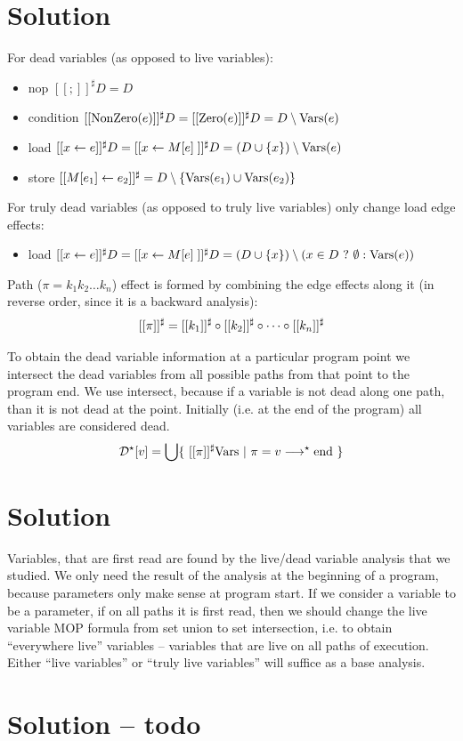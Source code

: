 \documentclass[a4paper]{article}
\def\la{\leftarrow}
\begin{document}
\section{Solution}
  For dead variables (as opposed to live variables):
  \begin{itemize}
    \item nop $ [[;]]^\sharp D = D $
    \item condition $ [[\mathrm{NonZero}(e)]]^\sharp D = [[\mathrm{Zero}(e)]]^\sharp D = D \setminus \mathrm{Vars}(e) $
    \item load $ [[x \la e]]^\sharp D = [[x \la M[e]\;]]^\sharp D = (D \cup \{ x \}) \setminus \Vars(e) $
    \item store $ [[M[e_1] \la e_2]]^\sharp = D \setminus \{ \Vars(e_1) \cup \Vars(e_2) \} $
  \end{itemize}

  For truly dead variables (as opposed to truly live variables) only change load edge effects:
  \begin{itemize}
  \item load $ [[x \la e]]^\sharp D = [[x \la M[e]\;]]^\sharp D = (D \cup \{ x \}) \setminus (x \in D\ ?\ \emptyset : \Vars(e)) $
  \end{itemize}

  Path ($ \pi = k_1 k_2 \dots k_n $) effect is formed by combining the edge
  effects along it (in reverse order, since it is a backward analysis):
  $$
    [[\pi]]^\sharp = [[k_1]]^\sharp \circ [[k_2]]^\sharp \circ \dots \circ [[k_n]]^\sharp
  $$

  To obtain the dead variable information at a particular program point we
  intersect the dead variables from all possible paths from that point to the
  program end. We use intersect, because if a variable is not dead along one
  path, than it is not dead at the point. Initially (i.e. at the end of the
  program) all variables are considered dead.
  $$
    \mathcal{D}^\star[v] = \bigcup \{\ [[\pi]]^\sharp \mathrm{Vars}\ |\ \pi = v \longrightarrow^\star \mbox{end}\ \}
  $$
  
\section{Solution}

Variables, that are first read are found by the live/dead variable analysis
that we studied. We only need the result of the analysis at the beginning of
a program, because parameters only make sense at program start. If we consider
a variable to be a parameter, if on all paths it is first read, then we should
change the live variable MOP formula from set union to set intersection, i.e.
to obtain ``everywhere live'' variables -- variables that are live on all paths
of execution. Either ``live variables'' or ``truly live variables'' will
suffice as a base analysis.

\section{Solution -- todo}
\end{document}
